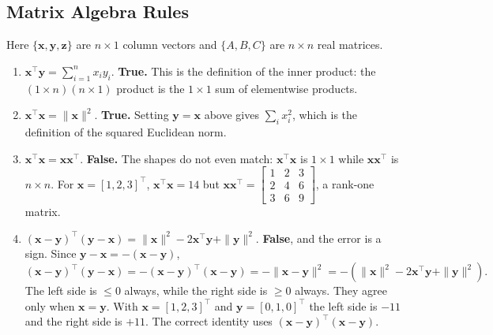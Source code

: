\documentclass[11pt]{article}
\begin{document}
\subsection{Matrix Algebra Rules}

Here $\{\mathbf{x},\mathbf{y},\mathbf{z}\}$ are $n \times 1$ column vectors and $\{A,B,C\}$ are
$n \times n$ real matrices.

\begin{enumerate}
  \item $\mathbf{x}^\top\mathbf{y} = \sum_{i=1}^{n} x_i y_i$. \textbf{True.} This is the definition of the
        inner product: the $(1\times n)(n \times 1)$ product is the $1 \times 1$ sum of elementwise products.

  \item $\mathbf{x}^\top\mathbf{x} = \|\mathbf{x}\|^2$. \textbf{True.} Setting $\mathbf{y} = \mathbf{x}$
        above gives $\sum_i x_i^2$, which is the definition of the squared Euclidean norm.

  \item $\mathbf{x}^\top\mathbf{x} = \mathbf{x}\mathbf{x}^\top$. \textbf{False.} The shapes do not even
        match: $\mathbf{x}^\top\mathbf{x}$ is $1 \times 1$ while $\mathbf{x}\mathbf{x}^\top$ is
        $n \times n$. For $\mathbf{x} = [1,2,3]^\top$, $\mathbf{x}^\top\mathbf{x} = 14$ but
        $\mathbf{x}\mathbf{x}^\top = \begin{bmatrix} 1&2&3\\2&4&6\\3&6&9\end{bmatrix}$, a rank-one matrix.

  \item $(\mathbf{x}-\mathbf{y})^\top(\mathbf{y}-\mathbf{x}) = \|\mathbf{x}\|^2 -
        2\mathbf{x}^\top\mathbf{y} + \|\mathbf{y}\|^2$.
        \textbf{False}, and the error is a sign. Since $\mathbf{y}-\mathbf{x} = -(\mathbf{x}-\mathbf{y})$,
        \[
          (\mathbf{x}-\mathbf{y})^\top(\mathbf{y}-\mathbf{x})
          = -(\mathbf{x}-\mathbf{y})^\top(\mathbf{x}-\mathbf{y})
          = -\|\mathbf{x}-\mathbf{y}\|^2
          = -(\|\mathbf{x}\|^2 - 2\mathbf{x}^\top\mathbf{y} + \|\mathbf{y}\|^2).
        \]
        The left side is $\le 0$ always, while the right side is $\ge 0$ always. They agree only when
        $\mathbf{x} = \mathbf{y}$. With $\mathbf{x} = [1,2,3]^\top$ and $\mathbf{y} = [0,1,0]^\top$ the
        left side is $-11$ and the right side is $+11$. The correct identity uses
        $(\mathbf{x}-\mathbf{y})^\top(\mathbf{x}-\mathbf{y})$.


\end{enumerate}
\end{document}
